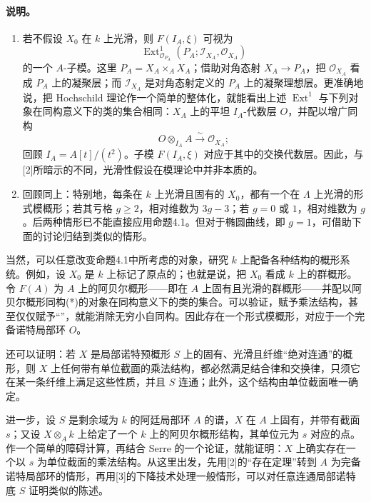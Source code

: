 \paragraph{说明。}
\begin{enumerate}
\item[(1)] 若不假设 $X_0$ 在 $k$ 上光滑，则 $F(I_A,\xi)$ 可视为
\[
 \operatorname{Ext}^1_{\mathcal O_{P_A}}(P_A;\mathcal I_{X_A},\mathcal O_{X_A})
\]
的一个 $A$-子模。这里 $P_A=X_A\times_A X_A$；借助对角态射 $X_A\to P_A$，把 $\mathcal O_{X_A}$ 看成 $P_A$ 上的凝聚层；而 $\mathcal I_{X_A}$ 是对角态射定义的 $P_A$ 上的凝聚理想层。更准确地说，把 Hochschild 理论作一个简单的整体化，就能看出上述 $\operatorname{Ext}^1$ 与下列对象在同构意义下的类的集合相同：$X_A$ 上的平坦 $I_A$-代数层 $O$，并配以增广同构
\[
 O\otimes_{I_A}A\xrightarrow{\sim}\mathcal O_{X_A};
\]
回顾 $I_A=A[t]/(t^2)$。子模 $F(I_A,\xi)$ 对应于其中的交换代数层。因此，与[2]所暗示的不同，光滑性假设在模理论中并非本质的。
\item[(2)] 回顾同上：特别地，每条在 $k$ 上光滑且固有的 $X_0$，都有一个在 $\Lambda$ 上光滑的形式模概形；若其亏格 $g\geq2$，相对维数为 $3g-3$；若 $g=0$ 或 $1$，相对维数为 $g$。后两种情形已不能直接应用命题4.1。但对于椭圆曲线，即 $g=1$，可借助下面的讨论归结到类似的情形。
\end{enumerate}
当然，可以任意改变命题4.1中所考虑的对象，研究 $k$ 上配备各种结构的概形系统。例如，设 $X_0$ 是 $k$ 上标记了原点的；也就是说，把 $X_0$ 看成 $k$ 上的群概形。令 $F(A)$ 为 $A$ 上的阿贝尔概形——即在 $A$ 上固有且光滑的群概形——并配以阿贝尔概形同构(*)的对象在同构意义下的类的集合。可以验证，赋予乘法结构，甚至仅仅赋予“”，就能消除无穷小自同构。因此存在一个形式模概形，对应于一个完备诺特局部环 $O$。

还可以证明：若 $X$ 是局部诺特预概形 $S$ 上的固有、光滑且纤维“绝对连通”的概形，则 $X$ 上任何带有单位截面的乘法结构，都必然满足结合律和交换律，只须它在某一条纤维上满足这些性质，并且 $S$ 连通；此外，这个结构由单位截面唯一确定。

进一步，设 $S$ 是剩余域为 $k$ 的阿廷局部环 $A$ 的谱，$X$ 在 $A$ 上固有，并带有截面 $s$；又设 $X\otimes_A k$ 上给定了一个 $k$ 上的阿贝尔概形结构，其单位元为 $s$ 对应的点。作一个简单的障碍计算，再结合 Serre 的一个论证，就能证明：$X$ 上确实存在一个以 $s$ 为单位截面的乘法结构。从这里出发，先用[2]的“存在定理”转到 $A$ 为完备诺特局部环的情形，再用[3]的下降技术处理一般情形，可以对任意连通局部诺特底 $S$ 证明类似的陈述。

